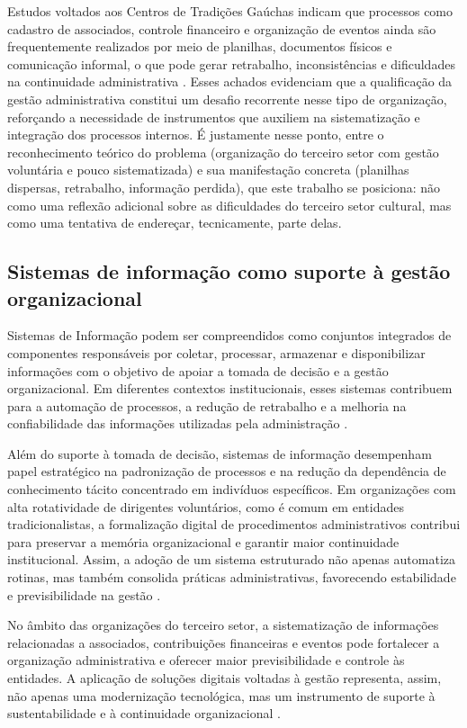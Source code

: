 \documentclass[12pt,a4paper]{article}
\begin{document}
Estudos voltados aos Centros de Tradições Gaúchas indicam que processos como cadastro de associados,
controle financeiro e organização de eventos ainda são frequentemente realizados por meio de
planilhas, documentos físicos e comunicação informal, o que pode gerar retrabalho, inconsistências e
dificuldades na continuidade administrativa \parencite{jardim2022,silvaalbarello2024}. Esses achados
evidenciam que a qualificação da gestão administrativa constitui um desafio recorrente nesse tipo de
organização, reforçando a necessidade de instrumentos que auxiliem na sistematização e integração dos
processos internos. É justamente nesse ponto, entre o reconhecimento teórico do problema (organização
do terceiro setor com gestão voluntária e pouco sistematizada) e sua manifestação concreta (planilhas
dispersas, retrabalho, informação perdida), que este trabalho se posiciona: não como uma reflexão
adicional sobre as dificuldades do terceiro setor cultural, mas como uma tentativa de endereçar,
tecnicamente, parte delas.

\subsection{Sistemas de informação como suporte à gestão organizacional}

Sistemas de Informação podem ser compreendidos como conjuntos integrados de componentes responsáveis
por coletar, processar, armazenar e disponibilizar informações com o objetivo de apoiar a tomada de
decisão e a gestão organizacional. Em diferentes contextos institucionais, esses sistemas contribuem
para a automação de processos, a redução de retrabalho e a melhoria na confiabilidade das
informações utilizadas pela administração \parencite{laudon2011,delone2003}.

Além do suporte à tomada de decisão, sistemas de informação desempenham papel estratégico na
padronização de processos e na redução da dependência de conhecimento tácito concentrado em
indivíduos específicos. Em organizações com alta rotatividade de dirigentes voluntários, como é
comum em entidades tradicionalistas, a formalização digital de procedimentos administrativos
contribui para preservar a memória organizacional e garantir maior continuidade institucional. Assim,
a adoção de um sistema estruturado não apenas automatiza rotinas, mas também consolida práticas
administrativas, favorecendo estabilidade e previsibilidade na gestão
\parencite{delone2003,vial2019}.

No âmbito das organizações do terceiro setor, a sistematização de informações relacionadas a
associados, contribuições financeiras e eventos pode fortalecer a organização administrativa e
oferecer maior previsibilidade e controle às entidades. A aplicação de soluções digitais voltadas à
gestão representa, assim, não apenas uma modernização tecnológica, mas um instrumento de suporte
à sustentabilidade e à continuidade organizacional \parencite{vial2019,verhoef2021}.
\end{document}
